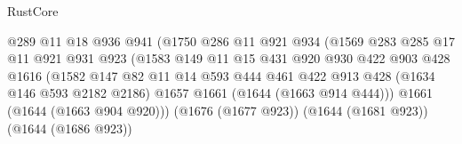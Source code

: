 \begin{lexlean}{RustCore}
\begin{coremodule}
                                          @289
                                          @11
                                          @18
                                          @936
                                          @941
                                          (@1750
                                            @286
                                            @11
                                            @921
                                            @934
                                            (@1569
                                              @283
                                              @285
                                              @17
                                              @11
                                              @921
                                              @931
                                              @923
                                              (@1583
                                                @149
                                                @11
                                                @15
                                                @431
                                                @920
                                                @930
                                                @422
                                                @903
                                                @428
                                                @1616
                                                (@1582
                                                  @147
                                                  @82
                                                  @11
                                                  @14
                                                  @593
                                                  @444
                                                  @461
                                                  @422
                                                  @913
                                                  @428
                                                  (@1634 @146 @593 @2182 @2186)
                                                  @1657
                                                  @1661
                                                  (@1644 (@1663 @914 @444)))
                                                @1661
                                                (@1644 (@1663 @904 @920)))
                                              (@1676 (@1677 @923))
                                              (@1644 (@1681 @923))
                                              (@1644 (@1686 @923))

\end{coremodule}
\end{lexlean}
